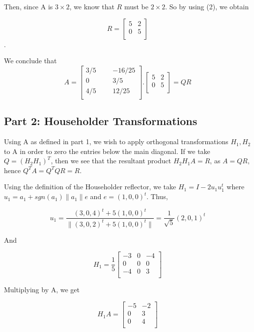 \documentclass[a4paper, 12pt, twoside]{article}
\begin{document}
Then, since A is $3 \times 2$, we know that $R$ must be $2 \times 2$. So by using (2), we obtain

$$
R = 
\begin{bmatrix}
	5 & 2\\
	0 & 5\\
\end{bmatrix}
$$.

We conclude that 
$$
A
=
\begin{bmatrix}
3/5& & &-16/25\\
0& & &	3/5\\
4/5& & & 12/25\\	
\end{bmatrix}.
\begin{bmatrix}
5 & 2\\
0 & 5\\
\end{bmatrix}
= QR
$$

\subsection{Part 2: Householder Transformations}

Using A as defined in part 1, we wish to apply orthogonal transformations $H_1, H_2$ to A in order to zero the entries below the main diagonal. If we take $Q = (H_2H_1)^T$, then we see that the resultant product $H_2H_1A = R$, as $A=QR$, hence $Q^TA = Q^TQR = R.$ 

Using the definition of the Householder reflector, we take $H_1 = I - 2u_1u_1^t$ where $u_1 = a_1 + sgn(a_1)\lVert a_1 \rVert e$ and $e = (1,0,0)^t$. Thus,

$$
u_1 = \frac{(3,0,4)^t + 5(1,0,0)^t}{\lVert (3,0,2)^t + 5(1,0,0)^t \rVert}
= \frac{1}{\sqrt{5}}(2,0,1)^t
$$

And

$$
H_1 = \frac{1}{5}
\begin{bmatrix}
-3 & 0 & -4 \\
0 & 0 & 0 \\
-4 & 0 & 3 \\
\end{bmatrix}
$$

Multiplying by A, we get

$$
H_1A =
\begin{bmatrix}
-5 & -2 \\ 0 & 3 \\ 0 & 4 \\
\end{bmatrix}
$$
\end{document}
